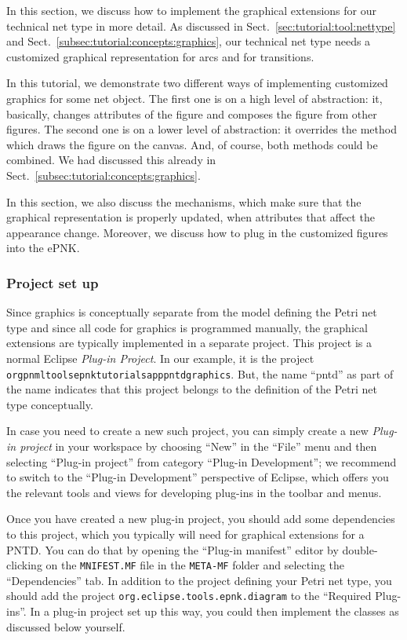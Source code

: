 In this section, we discuss how to implement the graphical extensions for our
technical net type in more detail. As discussed in
Sect.~\ref{sec:tutorial:tool:nettype} and
Sect.~\ref{subsec:tutorial:concepts:graphics}, our technical net type needs a
customized graphical representation for arcs and for transitions.

In this tutorial, we demonstrate two different ways of implementing customized
graphics for some net object. The first one is on a high level of abstraction:
it, basically, changes attributes of the figure and composes the figure from other
figures. The second one is on a lower level of abstraction: it overrides the
method which draws the figure on the canvas. And, of course, both methods could
be combined. We had discussed this already in
Sect.~\ref{subsec:tutorial:concepts:graphics}.

In this section, we also discuss the mechanisms, which make sure that the
graphical representation is properly updated, when attributes that affect
the appearance change. Moreover, we discuss how to plug in the customized
figures into the ePNK. 

\subsubsection{Project set up}
\label{subsubsec:tutorial:technical:graphics:setup}

Since graphics is conceptually separate from the model defining the Petri net
type and since all code for graphics is programmed manually, the graphical
extensions are typically implemented in a separate project. This project is a normal
Eclipse \emph{Plug-in Project}. In our example, it is the project {\tt
org\qnsep{}pnml\qnsep{}tools\qnsep{}epnk\qnsep{}tutorials\qnsep{}app\qnsep{}pntd\qnsep{}graphics}.
But, the name ``pntd'' as part of the name indicates that this project belongs to the definition of the
Petri net type conceptually.

In case you need to create a new such project, you can simply create a new
\emph{Plug-in project} in your workspace by choosing ``New'' in the ``File''
menu and then selecting ``Plug-in project'' from category ``Plug-in
Development''; we recommend to switch to the ``Plug-in Development'' perspective
of Eclipse, which offers you the relevant tools and views for developing plug-ins in the toolbar and menus.

Once you have created a new plug-in project, you should add some dependencies
to this project, which you typically will need for graphical extensions for
a PNTD. You can do that by opening the ``Plug-in manifest'' editor by
double-clicking on the {\tt MNIFEST.MF} file in the {\tt META-MF} folder
and selecting the ``Dependencies'' tab. In addition to the project defining your
Petri net type, you should add the project {\tt org.eclipse.tools.epnk.diagram}
to the ``Required Plug-ins''.
In a plug-in project set up this way, you could then implement the classes
as discussed below yourself.


